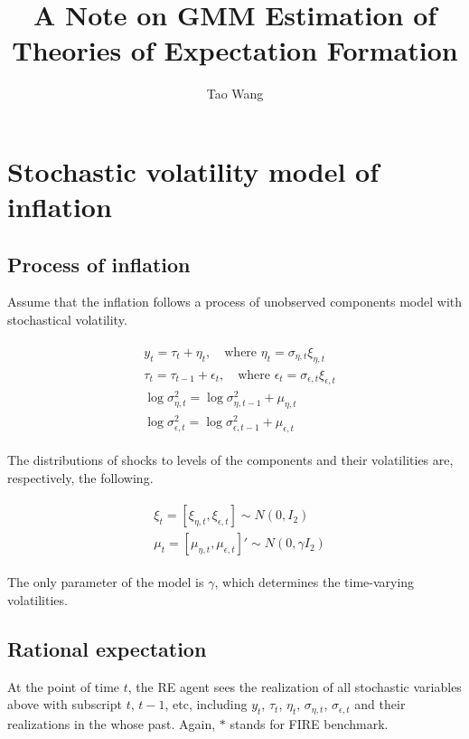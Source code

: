 \documentclass[]{article}
\title{A Note on GMM Estimation of Theories of Expectation Formation}
\author{Tao Wang}
\begin{document}
\maketitle


\section{Stochastic volatility model of inflation}

\subsection{Process of inflation}

Assume that the inflation follows a process of unobserved components model with stochastical volatility. 

\begin{eqnarray}
\begin{split}
& y_t = \tau_t + \eta_t,\quad \textrm{where } \eta_t =\sigma_{\eta,t} \xi_{\eta,t} \\
& \tau_t = \tau_{t-1} + \epsilon_t, \quad \textrm{where }  \epsilon_t =\sigma_{\epsilon,t} \xi_{\epsilon,t} \\
& \log\sigma^2_{\eta,t} = \log\sigma^2_{\eta,t-1} + \mu_{\eta,t} \\
& \log\sigma^2_{\epsilon,t} = \log\sigma^2_{\epsilon,t-1} + \mu_{\epsilon,t} 
\end{split}
\end{eqnarray}

The distributions of shocks to levels of the components and their volatilities are, respectively, the following.

\begin{eqnarray}
\begin{split}
& \xi_t =[\xi_{\eta,t},\xi_{\epsilon,t}] \sim N(0,I_2) \\
& \mu_{t} = [\mu_{\eta,t},\mu_{\epsilon,t}]' \sim N(0,\gamma I_2) 
\end{split}
\end{eqnarray}

The only parameter of the model is $\gamma$, which determines the time-varying volatilities. 

\subsection{Rational expectation}

At the point of time $t$, the RE agent sees the realization of all stochastic variables above with subscript $t$, $t-1$, etc, including $y_t$, $\tau_t$, $\eta_t$, $\sigma_{\eta,t}$, $\sigma_{\epsilon,t}$ and their realizations in the whose past. Again, $*$ stands for FIRE benchmark. 
\end{document}
